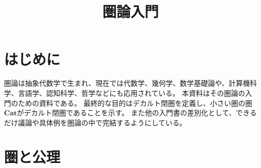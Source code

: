 \documentclass[dvipdfmx]{jsarticle}
\newcommand{\cat}[1]{\boldsymbol{#1}}
\begin{document}
	\title{圏論入門}
	\maketitle
	\tableofcontents
	\section{はじめに}
	圏論は抽象代数学で生まれ、現在では代数学、幾何学、数学基礎論や、計算機科学、言語学、認知科学、哲学などにも応用されている。
	本資料はその圏論の入門のための資料である。
	最終的な目的はデカルト閉圏を定義し、小さい圏の圏$\cat{Cat}$がデカルト閉圏であることを示す。
	また他の入門書の差別化として、できるだけ議論や具体例を圏論の中で完結するようにしている。
	\section{圏と公理}
\end{document}
